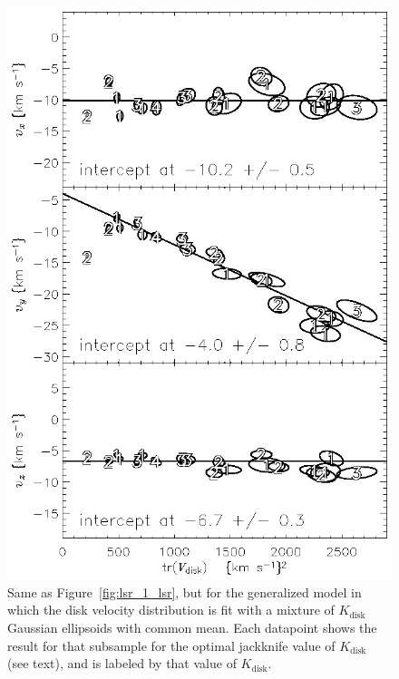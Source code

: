 \documentclass[12pt,preprint]{aastex}
\newcommand{\Kdisk}{K_\mathrm{disk}}
\begin{document}
\clearpage
\begin{figure}
\includegraphics{lsr_bestngauss_lsr.ps}
\caption{Same as Figure~\ref{fig:lsr_1_lsr}, but for the generalized
model in which the disk velocity distribution is fit with a mixture of
$\Kdisk$ Gaussian ellipsoids with common mean.  Each datapoint shows
the result for that subsample for the optimal jackknife value of
$\Kdisk$ (see text), and is labeled by that value of
$\Kdisk$.\label{fig:lsr_bestngauss_lsr}}
\end{figure}
\end{document}
